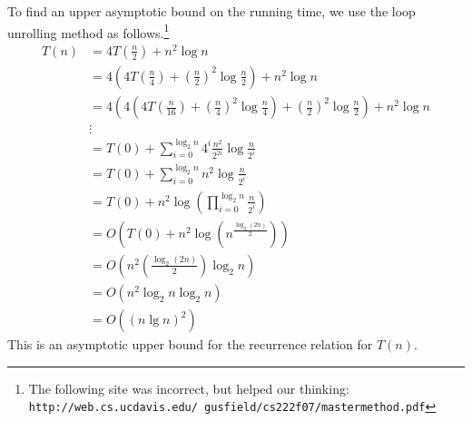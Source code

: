 \documentclass[12pt]{article}
\begin{document}
\begin{enumerate}
  To find an upper asymptotic bound on the running time, we use the loop unrolling method as follows.\footnote{The following site was incorrect, but helped our thinking:\\ 
\texttt{http://web.cs.ucdavis.edu/~gusfield/cs222f07/mastermethod.pdf}}\\
    \begin{align*}
    T(n) &= 4T\left(\frac{n}{2}\right) + n^2\log n\\
    &= 4\left(4T\left(\frac{n}{4}\right) + \left(\frac{n}{2}\right)^2\log \frac{n}{2}\right) + n^2\log n\\
    &= 4\left(4\left(4T\left(\frac{n}{16}\right) + \left(\frac{n}{4}\right)^2\log \frac{n}{4}\right) + \left(\frac{n}{2}\right)^2\log \frac{n}{2}\right) + n^2\log n\\
    &\vdots\\
    &= T(0) + \sum_{i = 0}^{\log_2 n} 4^i \frac{n^2}{2^{2i}} \log \frac{n}{2^i}\\
    &= T(0) + \sum_{i=0}^{\log_2 n} n^2 \log \frac{n}{2^i}\\
    &= T(0) + n^2 \log \left( \prod_{i=0}^{\log_2 n} \frac{n}{2^i}\right)\\
    &= O\left(T(0) + n^2 \log \left(n^{\frac{\log_2(2n)}{2}}\right)\right)\\
    &= O\left( n^2 \left(\frac{\log_2(2n)}{2}\right)\log_2 n\right)\\
    &= O\left( n^2 \log_2 n \log_2 n\right)\\
    &= \boxed{O\left( \left(n\lg n\right)^2\right)}
    \end{align*}
    This is an asymptotic upper bound for the recurrence relation for $T(n)$.
	

\end{enumerate}
\end{document}
